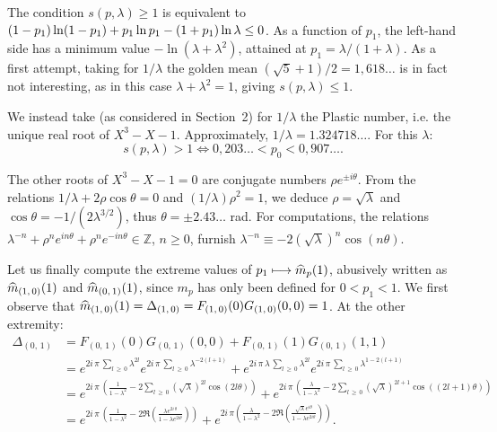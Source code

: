 \documentclass[10pt]{amsart}
\theoremstyle{definition}\newtheorem{defi}[theo]{Definition}\newtheorem{rema}[theo]{Remark}\newtheorem{exam}[theo]{Example}\newtheorem{exem}[theo]{Example}\newtheorem{nota}[theo]{Notation}
\newcommand{\Zbb}{\mathbb Z}
\let\oldhat\hat
\renewcommand*{\hat}[1]{\mathchoice{\widehat{#1}}{\widehat{#1}}{\oldhat{#1}}{\oldhat{#1}}}
\begin{document}
The condition $s(p,\lambda)\geq1$ is equivalent to $(1-p_1)\ln (1-p_1)+p_1\ln p_1-(1+p_1)\ln\lambda\linebreak\leq0$. As a function of $p_1$, the left-hand side has a minimum value $-\ln(\lambda+\lambda^2)$, attained at $p_1=\lambda/(1+\lambda)$. As a first attempt, taking for $1/\lambda$ the golden mean $(\sqrt{5}+1)/2=1,618\dots$ is in fact not interesting, as in this case $\lambda+\lambda^2=1$, giving $s(p,\lambda)\leq1$.

We instead take (as considered in Section~2) for $1/\lambda$ the Plastic number, i.e. the unique real root of $X^3-X-1$. Approximately, $1/\lambda=1.324718\dots$. For this $\lambda$:
\[
s(p,\lambda)>1\Longleftrightarrow 0,203\dots<p_0<0,907\dots.
\]


The other roots of $X^3-X-1=0$ are conjugate numbers $\rho e^{\pm i\theta}$. From the relations $1/\lambda+2\rho\cos\theta=0$ and $(1/\lambda)\rho^2=1$, we deduce $\rho=\sqrt{\lambda}$ and $\cos\theta=-1/(2\lambda^{3/2})$, thus $\theta=\pm2.43\dots$ rad. For computations, the relations $\lambda^{-n}+\rho^ne^{in\theta}+\rho^ne^{-in\theta}\in\Zbb$, $n\geq0$, furnish $\lambda^{-n}\equiv-2(\sqrt{\lambda})^n\cos(n\theta)$.

Let us finally compute the extreme values of $p_1\longmapsto \hat{m}_p(1)$, abusively written as $\hat{m}_{(1,\,0)}(1)$ and $\hat{m}_{(0,\,1)}(1)$, since $m_p$ has only been defined for $0<p_1<1$. We first observe that $\hat{m}_{(1,\,0)}(1)=\Delta_{(1,\,0)}=F_{(1,\,0)}(0)G_{(1,\,0)}(0,0)=1$. At the other extremity:
\begin{align*}
\Delta_{(0,\,1)}&=F_{(0,\,1)}(0)G_{(0,\,1)}(0,0)+F_{(0,\,1)}(1)G_{(0,\,1)}(1,1)\\
&=e^{2i\,\pi\,\sum_{l\,\geq\,0}\lambda^{2l}}e^{2i\,\pi\,\sum_{l\,\geq\,0}\lambda^{-2(l+1)}}+e^{2i\,\pi\,\lambda\,\sum_{l\,\geq\,0}\lambda^{2l}}e^{2i\,\pi\,\sum_{l\,\geq\,0}\lambda^{1-2(l+1)}}\\
&=e^{2i\,\pi\,\left({\frac{1}{1-\lambda^2}-2\sum_{l\,\geq\,0}\left(\sqrt\lambda\right)^{2l}\cos(2l\theta)}\right)}+e^{2i\,\pi\,\left({\frac{\lambda}{1-\lambda^2}-2\sum_{l\,\geq\,0}\left(\sqrt\lambda\right)^{2l+1}\cos((2l+1)\theta)}\right)}\\
&=e^{2i\,\pi\,\left({\frac{1}{1-\lambda^2}-2\Re\left({\frac{\lambda e^{2i\,\theta}}{1-\lambda e^{2i\theta}}}\right)}\right)}+e^{2i\,\pi\left({\frac{\lambda}{1-\lambda^2}-2\Re\left({\frac{\sqrt{\lambda}e^{i\theta}}{1-\lambda e^{2i\theta}}}\right)}\right)}.
\end{align*}
\end{document}
